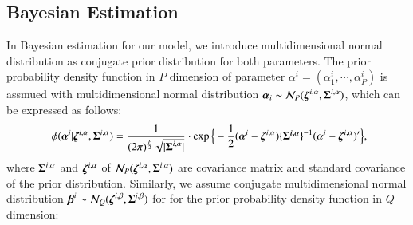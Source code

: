 \documentclass[a4paper,oneside,onecolumn,preprint,10pt,authoryear]{elsarticle}
\begin{document}
\subsection{Bayesian Estimation}
\label{sec54}
In Bayesian estimation for our model, we introduce multidimensional normal distribution as conjugate prior distribution for both parameters. The prior probability density function in $P$ dimension of parameter $\alpha^i=(\alpha^i_1,\cdots,\alpha^i_P)$ is assmued with multidimensional normal distribution  $\mbox{\boldmath$\alpha$}_i\sim{\cal{N}}_P(\mbox{\boldmath$\zeta$}^{i,\alpha},\mbox{\boldmath$\Sigma$}^{i,\alpha})$, which can be expressed as follows:
   \begin{eqnarray}
      && \hspace{-2mm}
      \phi(\mbox{\boldmath$\alpha$}^i|
      \mbox{\boldmath$\zeta$}^{i,\alpha},\mbox{\boldmath$\Sigma$}^{i,\alpha})
      = \frac{1}{(2\pi)^{\frac{P}{2}}\sqrt{|\mbox{\boldmath$\Sigma$}^{i,\alpha}|}}
      \cdot \exp\Big\{-\frac{1}{2}(\mbox{\boldmath$\alpha$}^i
      -\mbox{\boldmath$\zeta$}^{i,\alpha})
      \lbrace\mbox{\boldmath$\Sigma^{i,\alpha}$}\rbrace^{-1}
      (\mbox{\boldmath$\alpha$}^i-\mbox{\boldmath$\zeta$}^{i,\alpha})^\prime\Big\},
            \label{Kseiki}
   \end{eqnarray}
where $\mbox{\boldmath$\Sigma$}^{i,\alpha}$ and $\mbox{\boldmath$\zeta$}^{i,\alpha}$ of ${\cal N}_P(\mbox{\boldmath$\zeta$}^{i,\alpha},\mbox{\boldmath$\Sigma$}^{i,\alpha})$  are  covariance matrix and standard covariance of the prior distribution. Similarly, we assume conjugate multidimensional normal distribution $\mbox{\boldmath$\beta$}^i \sim {\cal N}_{Q}(\mbox{\boldmath$\zeta$}^{i,\beta},\mbox{\boldmath$\Sigma$}^{i,\beta})$ for for the prior probability density function in $Q$ dimension:
\end{document}
